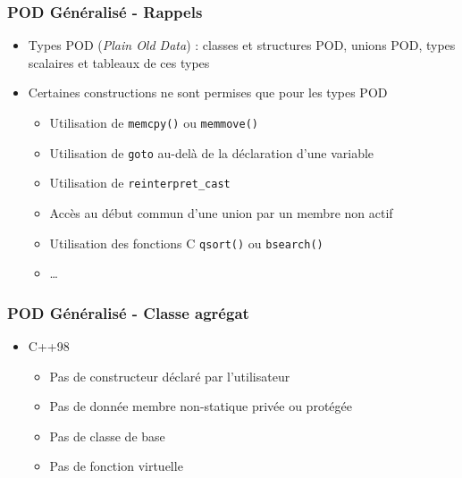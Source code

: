 \documentclass[C++.tex]{subfiles}
\begin{document}
\begin{frame}[fragile]
	\frametitle{POD Généralisé - Rappels}
	\begin{itemize}
		\item Types POD (\textit{Plain Old Data}) : classes et structures POD, unions POD, types scalaires et tableaux de ces types
		\item Certaines constructions ne sont permises que pour les types POD


		\begin{itemize}
			\item Utilisation de \lstinline|memcpy()| ou \lstinline|memmove()|
			\item Utilisation de \lstinline|goto| au-delà de la déclaration d'une variable


			\item Utilisation de \lstinline|reinterpret_cast|
			\item Accès au début commun d'une union par un membre non actif
			\item Utilisation des fonctions C \lstinline|qsort()| ou \lstinline|bsearch()|
			\item \ldots
		\end{itemize}
	\end{itemize}
\end{frame}

\begin{frame}[fragile]
	\frametitle{POD Généralisé - Classe agrégat}
	\begin{itemize}
		\item C++98
		\begin{itemize}
			\item Pas de constructeur déclaré par l'utilisateur
			\item Pas de donnée membre non-statique privée ou protégée
			\item Pas de classe de base
			\item Pas de fonction virtuelle
		\end{itemize}
	\end{itemize}
\end{frame}
\end{document}
